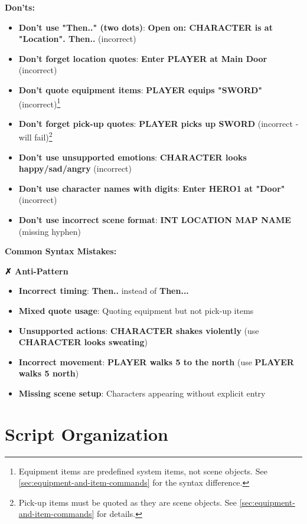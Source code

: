 \documentclass[11pt,letterpaper,oldstylefigures]{memoir}
\newenvironment{AntiPattern}
{\begingroup
\small
\setlength{\parindent}{0pt}
\setlength{\parskip}{0.5em}
\allowdisplaybreaks
\setlength{\displaywidowpenalty}{0}
\setlength{\widowpenalty}{0}
\setlength{\clubpenalty}{0}
\setlength{\interlinepenalty}{0}
\begin{tcolorbox}[
    colback=red!5,
    colframe=red!75!black,
    boxrule=0.5pt,
    arc=2pt,
    left=0.5em,
    right=0.5em,
    top=0.25em,
    bottom=0.25em
]
\textbf{✗ Anti-Pattern}
\end{tcolorbox}\par
}
{\endgroup}
\newcommand{\fountain}[1]{\textbf{#1}}
\begin{document}
\textbf{Don'ts:}
\begin{itemize}
\item \textbf{Don't use "Then.." (two dots)}: \fountain{Open on: CHARACTER is at "Location". Then..} (incorrect)
\item \textbf{Don't forget location quotes}: \fountain{Enter PLAYER at Main Door} (incorrect)
\item \textbf{Don't quote equipment items}: \fountain{PLAYER equips "SWORD"} (incorrect)\footnote{Equipment items are predefined system items, not scene objects. See \autoref{sec:equipment-and-item-commands} for the syntax difference.}
\item \textbf{Don't forget pick-up quotes}: \fountain{PLAYER picks up SWORD} (incorrect - will fail)\footnote{Pick-up items must be quoted as they are scene objects. See \autoref{sec:equipment-and-item-commands} for details.}
\item \textbf{Don't use unsupported emotions}: \fountain{CHARACTER looks happy/sad/angry} (incorrect)
\item \textbf{Don't use character names with digits}: \fountain{Enter HERO1 at "Door"} (incorrect)
\item \textbf{Don't use incorrect scene format}: \fountain{INT LOCATION MAP NAME} (missing hyphen)
\end{itemize}

\textbf{Common Syntax Mistakes:}
\begin{AntiPattern}
\begin{itemize}
\item \textbf{Incorrect timing}: \fountain{Then..} instead of \fountain{Then...}
\item \textbf{Mixed quote usage}: Quoting equipment but not pick-up items
\item \textbf{Unsupported actions}: \fountain{CHARACTER shakes violently} (use \fountain{CHARACTER looks sweating})
\item \textbf{Incorrect movement}: \fountain{PLAYER walks 5 to the north} (use \fountain{PLAYER walks 5 north})
\item \textbf{Missing scene setup}: Characters appearing without explicit entry
\end{itemize}
\end{AntiPattern}

\section{Script Organization}
\end{document}
